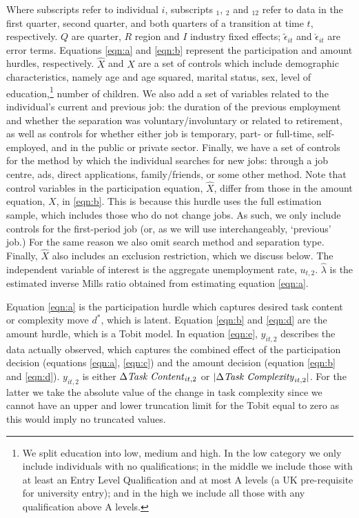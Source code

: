 \documentclass[12pt,authoryear]{elsarticle}
\begin{document}
Where subscripts refer to individual $i$, subscripts $_1$, $_2$ and $_{12}$ refer to data in the first quarter, second quarter, and both quarters of a transition at time $t$, respectively. $Q$ are quarter, $R$ region and $I$ industry fixed effects; $\tilde{\epsilon}_{it}$ and $\check{\epsilon}_{it}$ are error terms. Equations \ref{eqn:a} and \ref{eqn:b} represent the participation and amount hurdles, respectively.  $\hat{X}$ and $X$ are a set of controls which include demographic characteristics, namely age and age squared, marital status, sex, level of education,\footnote{We split education into low, medium and high. In the low category we only include individuals with no qualifications; in the middle we include those with at least an Entry Level Qualification and at most A levels (a UK pre-requisite for university entry); and in the high we include all those with any qualification above A levels.} number of children. We also add a set of variables related to the individual's current and previous job: the duration of the previous employment and whether the separation was voluntary/involuntary or related to retirement, as well as controls for whether either job is temporary, part- or full-time, self-employed, and in the public or private sector. Finally, we have a set of controls for the method by which the individual searches for new jobs: through a job centre, ads, direct applications, family/friends, or some other method.  Note that control variables in the participation equation, $\hat{X}$, differ from those in the amount equation, $X$, in \ref{eqn:b}. This is because this hurdle uses the full estimation sample, which includes those who do not change jobs. As such, we only include controls for the first-period job (or, as we will use interchangeably, `previous' job.) For the same reason we also omit search method and separation type. Finally, $\hat{X}$ also includes an exclusion restriction, which we discuss below. The independent variable of interest is the aggregate unemployment rate, $u_{t,2}$.  $\hat{\lambda}$ is the estimated inverse Mills ratio obtained from estimating equation \ref{eqn:a}. 


\vspace{2mm}


Equation \ref{eqn:a} is the participation hurdle which captures desired task content or complexity move  $d^{*}$, which is latent. Equation \ref{eqn:b} and  \ref{eqn:d} are the amount hurdle, which is a Tobit model. In equation \ref{eqn:e}, $y_{it,2}$ describes the data actually observed, which captures the combined effect of the participation decision (equations \ref{eqn:a}, \ref{eqn:c}) and the amount decision (equation \ref{eqn:b} and \ref{eqn:d}). $y_{it,2}$ is either $\Delta\text{\textit{Task Content}}_{it,2}$ 
or $|\Delta\text{\textit{Task Complexity}}_{it,2}|$. For the latter we take the absolute value of the change in task complexity since we cannot have an upper and lower truncation limit for the Tobit equal to zero as this would imply no truncated values. 
\end{document}
